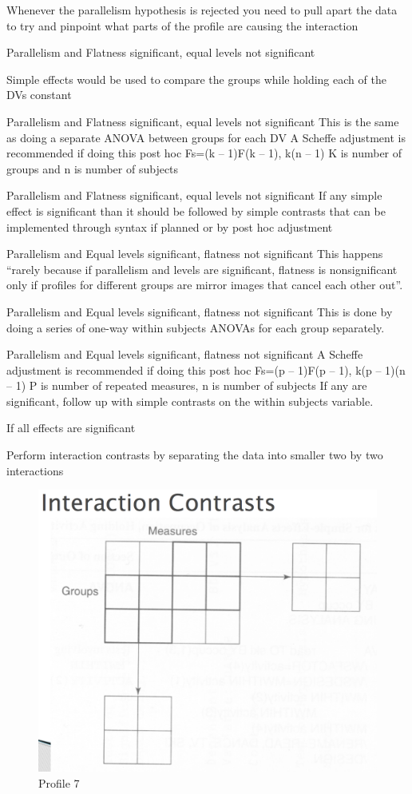\documentclass[]{book}
\theoremstyle{definition}
\theoremstyle{definition}
\theoremstyle{definition}
\theoremstyle{remark}
\begin{document}
Whenever the parallelism hypothesis is rejected you need to pull apart
the data to try and pinpoint what parts of the profile are causing the
interaction

Parallelism and Flatness significant, equal levels not significant

Simple effects would be used to compare the groups while holding each of
the DVs constant

Parallelism and Flatness significant, equal levels not significant This
is the same as doing a separate ANOVA between groups for each DV A
Scheffe adjustment is recommended if doing this post hoc Fs=(k -- 1)F(k
-- 1), k(n -- 1) K is number of groups and n is number of subjects

Parallelism and Flatness significant, equal levels not significant If
any simple effect is significant than it should be followed by simple
contrasts that can be implemented through syntax if planned or by post
hoc adjustment

Parallelism and Equal levels significant, flatness not significant This
happens ``rarely because if parallelism and levels are significant,
flatness is nonsignificant only if profiles for different groups are
mirror images that cancel each other out''.

Parallelism and Equal levels significant, flatness not significant This
is done by doing a series of one-way within subjects ANOVAs for each
group separately.

Parallelism and Equal levels significant, flatness not significant A
Scheffe adjustment is recommended if doing this post hoc Fs=(p -- 1)F(p
-- 1), k(p -- 1)(n -- 1) P is number of repeated measures, n is number
of subjects If any are significant, follow up with simple contrasts on
the within subjects variable.

If all effects are significant

Perform interaction contrasts by separating the data into smaller two by
two interactions

\begin{figure}
\centering
\includegraphics{img/jhprofile7.png}
\caption{Profile 7}
\end{figure}
\end{document}
